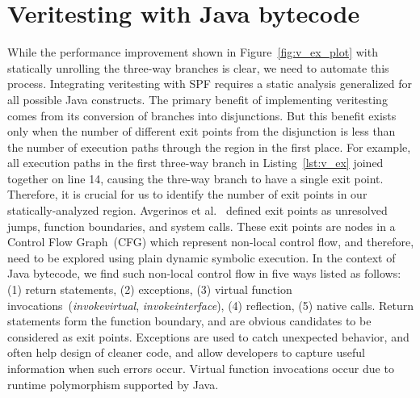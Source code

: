 \section{Veritesting with Java bytecode}
%
%
%
While the performance improvement shown in Figure~\ref{fig:v_ex_plot} with statically unrolling the three-way branches is clear, we need to automate this process.
%
Integrating veritesting with SPF requires a static analysis generalized for all possible Java constructs.
%
The primary benefit of implementing veritesting comes from its conversion of branches into disjunctions.
%
But this benefit exists only when the number of different exit points from the disjunction is less than the number of execution paths through the region in the first place.
%
For example, all execution paths in the first three-way branch in Listing~\ref{lst:v_ex} joined together on line 14, causing the thre-way branch to have a single exit point.
%
Therefore, it is crucial for us to identify the number of exit points in our statically-analyzed region.
%
Avgerinos et al.~\cite{veritesting} defined exit points as unresolved jumps, function boundaries, and system calls.
%
These exit points are nodes in a Control Flow Graph~(CFG) which represent non-local control flow, and therefore, need to be explored using plain dynamic symbolic execution.
%
In the context of Java bytecode, we find such non-local control flow in five ways listed as follows: (1) return statements, (2) exceptions, (3) virtual function invocations~(\textit{invokevirtual}, \textit{invokeinterface}), (4) reflection, (5) native calls.
%
Return statements form the function boundary, and are obvious candidates to be considered as exit points.
%
Exceptions are used to catch unexpected behavior, and often help design of cleaner code, and allow developers to capture useful information when such errors occur.
%
Virtual function invocations occur due to runtime polymorphism supported by Java.
